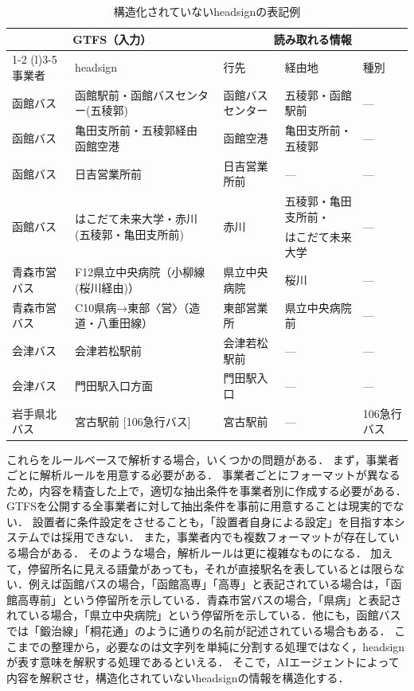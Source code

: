 \begin{table}[tb]
    \centering
    \caption{構造化されていないheadsignの表記例}
    \label{tab:headsign}
    \footnotesize
    \begin{tabular}{lllll}
        \toprule
        \multicolumn{2}{c}{GTFS（入力）} & \multicolumn{3}{c}{読み取れる情報} \\
        \cmidrule(r){1-2} \cmidrule(l){3-5}
        事業者 & headsign & 行先 & 経由地 & 種別 \\
        \midrule
        函館バス & 函館駅前・函館バスセンター(五稜郭) & 函館バスセンター & 五稜郭・函館駅前 & --- \\
        函館バス & 亀田支所前・五稜郭経由 函館空港 & 函館空港 & 亀田支所前・五稜郭 & --- \\
        函館バス & 日吉営業所前 & 日吉営業所前 & --- & --- \\
        \multirow{2}{*}{函館バス} & \multirow{2}{*}{はこだて未来大学・赤川(五稜郭・亀田支所前)} & \multirow{2}{*}{赤川} & 五稜郭・亀田支所前・ & \multirow{2}{*}{---} \\
        & & & はこだて未来大学 & \\
        青森市営バス & \faWheelchair{}F12県立中央病院（小柳線(桜川経由)） & 県立中央病院 & 桜川 & --- \\
        青森市営バス & \faWheelchair{}C10県病→東部〈営〉（造道・八重田線） & 東部営業所 & 県立中央病院前 & --- \\
        会津バス & 会津若松駅前 & 会津若松駅前 & --- & --- \\
        会津バス & 門田駅入口方面 & 門田駅入口 & --- & --- \\
        岩手県北バス & 宮古駅前 [106急行バス] & 宮古駅前 & --- & 106急行バス \\
        \bottomrule
    \end{tabular}
\end{table}

これらをルールベースで解析する場合，いくつかの問題がある．
まず，事業者ごとに解析ルールを用意する必要がある．
事業者ごとにフォーマットが異なるため，内容を精査した上で，適切な抽出条件を事業者別に作成する必要がある．
GTFSを公開する全事業者に対して抽出条件を事前に用意することは現実的でない．
設置者に条件設定をさせることも，「設置者自身による設定」を目指す本システムでは採用できない．
また，事業者内でも複数フォーマットが存在している場合がある．
そのような場合，解析ルールは更に複雑なものになる．
加えて，停留所名に見える語彙があっても，それが直接駅名を表しているとは限らない．例えば函館バスの場合，「函館高専」「高専」と表記されている場合は，「函館高専前」という停留所を示している．青森市営バスの場合，「県病」と表記されている場合，「県立中央病院」という停留所を示している．他にも，函館バスでは「鍛治線」「桐花通」のように通りの名前が記述されている場合もある．
ここまでの整理から，必要なのは文字列を単純に分割する処理ではなく，headsignが表す意味を解釈する処理であるといえる．
そこで，AIエージェントによって内容を解釈させ，構造化されていないheadsignの情報を構造化する．

